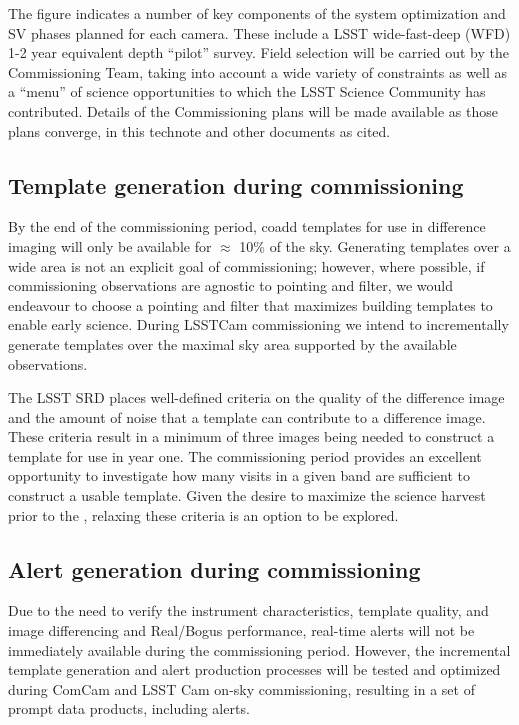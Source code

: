 The figure indicates a number of key components of the system optimization and SV phases planned for each camera.
These include a LSST wide-fast-deep (WFD) 1-2 year equivalent depth ``pilot'' survey.
Field selection will be carried out by the Commissioning Team, taking into account a wide variety of constraints as well as a ``menu'' of science opportunities to which the LSST Science Community has contributed.
Details of the Commissioning plans will be made available as those plans converge, in this technote and other documents as cited.


\subsection{Template generation during commissioning}

By the end of the commissioning period, coadd templates for use in difference imaging will only be available for $\approx$ 10\% of the sky.
Generating templates over a wide area is not an explicit goal of commissioning;  however, where possible, if commissioning observations are agnostic to pointing and filter, we would endeavour to choose a pointing and filter that maximizes building templates to enable early science.
During LSSTCam commissioning we intend to incrementally generate templates over the maximal sky area supported by the available observations.

The LSST SRD places well-defined criteria on the quality of the difference image and the amount of noise that a template can contribute to a difference image.
These criteria result in a minimum of three images being needed to construct a template for use in year one.
The commissioning period provides an excellent opportunity to investigate how many visits in a given band are sufficient to construct a usable template.
Given the desire to maximize the science harvest prior to the \drone,  relaxing these criteria is an option to be explored.


\subsection{Alert generation during commissioning}

Due to the need to verify the instrument characteristics, template quality, and image differencing and Real/Bogus performance, real-time alerts will not be immediately available during the commissioning period.
However, the incremental template generation and alert production processes will be tested and optimized during ComCam and LSST Cam on-sky commissioning, resulting in a set of prompt data products, including alerts.

